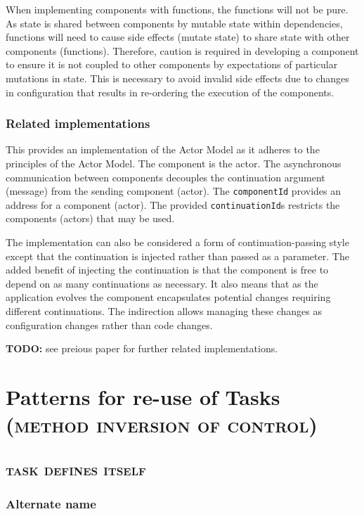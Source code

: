 \documentclass[prodmode]{style/acmlarge}
\begin{document}
When implementing components with functions, the functions will not be pure.  As
state is shared between components by mutable state within dependencies,
functions will need to cause side effects (mutate state) to share state with
other components (functions).  Therefore, caution is required in developing a
component to ensure it is not coupled to other components by expectations of
particular mutations in state.  This is necessary to avoid invalid side effects
due to changes in configuration that results in re-ordering the execution of the
components.


\subsubsection*{Related implementations}

This provides an implementation of the Actor Model \cite{actors} as it adheres
to the principles of the Actor Model.  The component is the actor.  The
asynchronous communication between components decouples the continuation
argument (message) from the sending component (actor).  The \texttt{componentId}
provides an address for a component (actor).  The provided
\texttt{continuationId}s restricts the components (actors) that may be used.

The implementation can also be considered a form of continuation-passing style
\cite{continuations} except that the continuation is injected rather than passed
as a parameter.  The added benefit of injecting the continuation is that the
component is free to depend on as many continuations as necessary.  It also
means that as the application evolves the component encapsulates potential
changes requiring different continuations.  The indirection allows managing
these changes as configuration changes rather than code changes.

\textbf{TODO:} see preious paper for further related implementations.



\section{Patterns for re-use of Tasks (\textsc{method inversion of control})}


\subsection{\textsc{\textbf{task defines itself}}}

\subsubsection*{Alternate name}
\end{document}
